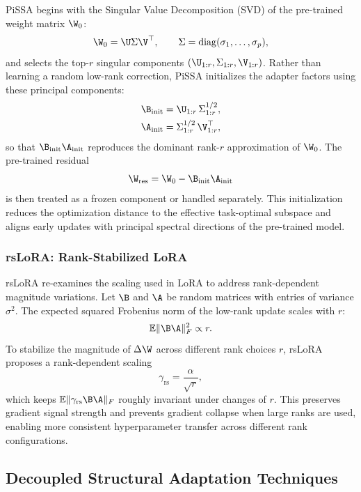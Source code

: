 PiSSA begins with the Singular Value Decomposition (SVD) of the pre-trained weight matrix $\W_0$:
\begin{equation}
  \W_0 = \U \Sigma \V^\top,\qquad \Sigma=\mathrm{diag}(\sigma_1,\dots,\sigma_p),
\end{equation}
and selects the top-$r$ singular components $(\U_{1:r},\Sigma_{1:r},\V_{1:r})$. Rather than learning a random low-rank correction, PiSSA initializes the adapter factors using these principal components:
\begin{align}
  \B_{\text{init}} &= \U_{1:r}\,\Sigma_{1:r}^{1/2}, \\
  \A_{\text{init}} &= \Sigma_{1:r}^{1/2}\,\V_{1:r}^\top,
\end{align}
so that $\B_{\text{init}}\A_{\text{init}}$ reproduces the dominant rank-$r$ approximation of $\W_0$. The pre-trained residual
\begin{equation}
  \W_{\text{res}} = \W_0 - \B_{\text{init}}\A_{\text{init}}
\end{equation}
is then treated as a frozen component or handled separately. This initialization reduces the optimization distance to the effective task-optimal subspace and aligns early updates with principal spectral directions of the pre-trained model.

\subsubsection{rsLoRA: Rank-Stabilized LoRA}
\label{subsubsec:rslora}

rsLoRA re-examines the scaling used in LoRA to address rank-dependent magnitude variations. Let $\B$ and $\A$ be random matrices with entries of variance $\sigma^2$. The expected squared Frobenius norm of the low-rank update scales with $r$:
\begin{equation}
  \mathbb{E}\|\B\A\|_F^2 \propto r.
\end{equation}
To stabilize the magnitude of $\Delta\W$ across different rank choices $r$, rsLoRA proposes a rank-dependent scaling
\begin{equation}
  \gamma_{\text{rs}} = \frac{\alpha}{\sqrt{r}},
\end{equation}
which keeps $\mathbb{E}\|\gamma_{\text{rs}}\B\A\|_F$ roughly invariant under changes of $r$. This preserves gradient signal strength and prevents gradient collapse when large ranks are used, enabling more consistent hyperparameter transfer across different rank configurations.

\subsection{Decoupled Structural Adaptation Techniques}
\label{subsec:decoupled}

